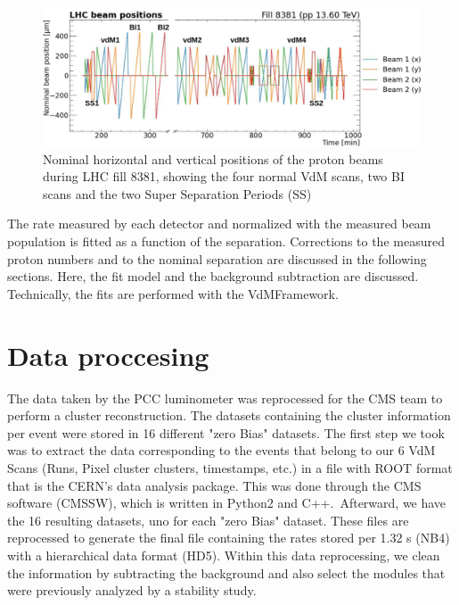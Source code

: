 \begin{center}
  \begin{figure}[h]
    \centering
    \includegraphics[scale=.25]{Chapter4/2022Scanprorgam.png}
    \caption[2022 scan program]{Nominal horizontal and vertical positions of the proton beams during LHC fill 8381, showing the four normal VdM scans, two BI scans and the two Super Separation Periods (SS)}
    \label{scan_prog}
  \end{figure}
\end{center}

The rate measured by each detector and normalized with the measured beam population is fitted as a function of the separation. Corrections to the measured proton numbers and to the nominal separation are discussed in the following sections. Here, the fit model and the background subtraction are discussed. Technically, the fits are performed with the VdMFramework.

\section{Data proccesing}

The data taken by the  PCC luminometer was reprocessed for the CMS team to perform a cluster reconstruction. The datasets containing the cluster information per event were stored in 16 different "zero Bias" datasets. The first step we took was to extract the data corresponding to the events that belong to our 6 VdM Scans (Runs, Pixel cluster clusters, timestamps, etc.) in a file with ROOT format that is the CERN's data analysis package. This was done through the CMS software (CMSSW), which is written in Python2 and C++.\
Afterward, we have the 16  resulting datasets, uno for each "zero Bias" dataset. These files are reprocessed to generate the final file containing the rates stored per 1.32 s (NB4) with a hierarchical data format (HD5). Within this data reprocessing, we clean the information by subtracting the background and also select the modules that were previously analyzed by a stability study.

